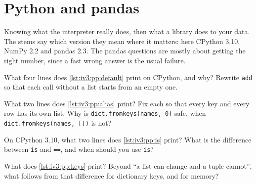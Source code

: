 

\chapter{Python and pandas}\label{ch:iv3:python-and-pandas}

\begin{ivtrains}
Knowing what the interpreter really does, then what a library does to your data. The stems say which version they mean where it matters: here CPython 3.10, NumPy 2.2 and pandas 2.3. The pandas questions are mostly about getting the right number, since a fast wrong answer is the usual failure.
\end{ivtrains}

\begin{question}\label{iq:iv3:python-and-pandas:1}
What four lines does \cref{lst:iv3:pp:default} print on CPython, and why? Rewrite \texttt{add} so that each call without a list starts from an empty one.
\label{lst:iv3:pp:default}
\end{question}

\begin{question}\label{iq:iv3:python-and-pandas:2}
What two lines does \cref{lst:iv3:pp:alias} print? Fix each so that every key and every row has its own list. Why is \texttt{dict.fromkeys(names, 0)} safe, when \texttt{dict.fromkeys(names, [])} is not?
\label{lst:iv3:pp:alias}
\end{question}

\begin{question}\label{iq:iv3:python-and-pandas:3}
On CPython 3.10, what two lines does \cref{lst:iv3:pp:is} print? What is the difference between \texttt{is} and \texttt{==}, and when should you use \texttt{is}?
\label{lst:iv3:pp:is}
\end{question}

\begin{question}\label{iq:iv3:python-and-pandas:4}
What does \cref{lst:iv3:pp:keys} print? Beyond ``a list can change and a tuple cannot'', what follows from that difference for dictionary keys, and for memory?
\label{lst:iv3:pp:keys}
\end{question}

